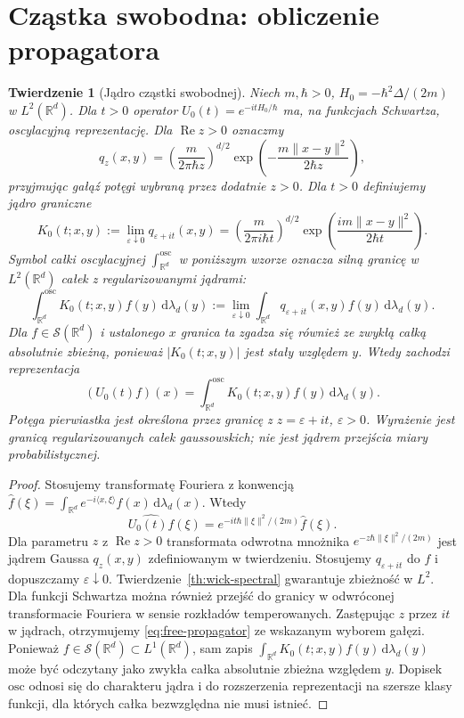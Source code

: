 \documentclass[11pt,a4paper,oneside]{report}
\numberwithin{equation}{chapter}
\theoremstyle{plain}
\newtheorem{twierdzenie}{Twierdzenie}[chapter]
\theoremstyle{definition}
\theoremstyle{remark}
\newcommand{\R}{\mathbb{R}}
\newcommand{\calS}{\mathcal{S}}
\newcommand{\dd}{\mathrm{d}}
\begin{document}
\section{Cząstka swobodna: obliczenie propagatora}\label{sec:volIII:16:04}

\begin{twierdzenie}[Jądro cząstki swobodnej]\label{thm:volIII:16:03}
\label{th:free-schrodinger-kernel}
Niech $m,\hbar>0$, $H_0=-\hbar^2\Delta/(2m)$ w
$L^2(\R^d)$. Dla $t>0$ operator
$U_0(t)=e^{-itH_0/\hbar}$ ma, na funkcjach Schwartza,
oscylacyjną reprezentację. Dla $\operatorname{Re}z>0$ oznaczmy
\[
q_z(x,y)=\left(\frac{m}{2\pi\hbar z}\right)^{d/2}
\exp\left(-\frac{m\|x-y\|^2}{2\hbar z}\right),
\]
przyjmując gałąź potęgi wybraną przez dodatnie $z>0$.
Dla $t>0$ definiujemy jądro graniczne
\[
K_0(t;x,y):=\lim_{\varepsilon\downarrow0}q_{\varepsilon+it}(x,y)
=\left(\frac{m}{2\pi i\hbar t}\right)^{d/2}
\exp\left(\frac{im\|x-y\|^2}{2\hbar t}\right).
\]
\emph{Symbol całki oscylacyjnej} $\int_{\R^d}^{\mathrm{osc}}$
w poniższym wzorze oznacza \emph{silną granicę w $L^2(\R^d)$}
całek z regularizowanymi jądrami:
\[
\int_{\R^d}^{\mathrm{osc}}K_0(t;x,y)f(y)\,\dd\lambda_d(y)
:=\lim_{\varepsilon\downarrow0}
\int_{\R^d}q_{\varepsilon+it}(x,y)f(y)\,\dd\lambda_d(y).
\]
Dla $f\in\calS(\R^d)$ i ustalonego $x$ granica ta
zgadza się również ze zwykłą całką absolutnie zbieżną,
ponieważ $|K_0(t;x,y)|$ jest stały względem $y$.
Wtedy zachodzi reprezentacja
\[
 (U_0(t)f)(x)=\int_{\R^d}^{\mathrm{osc}}
 K_0(t;x,y)f(y)\,\dd\lambda_d(y).
\tag{16.6}\label{eq:free-propagator}
\]
Potęga pierwiastka jest określona przez granicę z
$z=\varepsilon+it$, $\varepsilon>0$. Wyrażenie jest
granicą regularizowanych całek gaussowskich; nie jest
jądrem przejścia miary probabilistycznej.
\end{twierdzenie}
\begin{proof}
Stosujemy transformatę Fouriera z konwencją
$\widehat f(\xi)=\int_{\R^d} e^{-i\langle x,\xi\rangle}
 f(x)\,\dd\lambda_d(x)$. Wtedy
\[
 \widehat{U_0(t)f}(\xi)
 =e^{-it\hbar\|\xi\|^2/(2m)}\widehat f(\xi).
\]
Dla parametru $z$ z $\operatorname{Re}z>0$
transformata odwrotna mnożnika
$e^{-z\hbar\|\xi\|^2/(2m)}$ jest jądrem Gaussa
$q_z(x,y)$ zdefiniowanym w twierdzeniu.
Stosujemy $q_{\varepsilon+it}$ do $f$ i dopuszczamy
$\varepsilon\downarrow0$. Twierdzenie~\ref{th:wick-spectral}
gwarantuje zbieżność w $L^2$. Dla funkcji Schwartza
można również przejść do granicy w odwróconej
transformacie Fouriera w sensie rozkładów temperowanych.
Zastępując $z$ przez $it$ w jądrach, otrzymujemy
\eqref{eq:free-propagator} ze wskazanym wyborem gałęzi.
Ponieważ $f\in\calS(\R^d)\subset L^1(\R^d)$,
sam zapis $\int_{\R^d} K_0(t;x,y)f(y)\,\dd\lambda_d(y)$
może być odczytany jako zwykła całka absolutnie zbieżna
względem $y$. Dopisek $\mathrm{osc}$ odnosi się do
charakteru jądra i do rozszerzenia reprezentacji na
szersze klasy funkcji, dla których całka bezwzględna
nie musi istnieć.
\end{proof}
\end{document}
